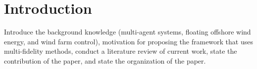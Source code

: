 \section{Introduction} \label{sec:introduction}
Introduce the background knowledge (multi-agent systems, floating offshore wind energy, and wind farm control), motivation for proposing the framework that uses multi-fidelity methods, conduct a literature review of current work, state the contribution of the paper, and state the organization of the paper. 